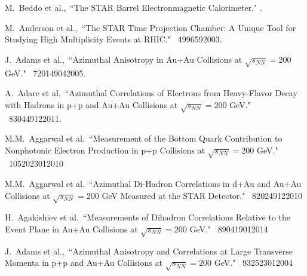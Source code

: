 \begin{thebibliography}{1000}

M.~Beddo et al.,~``The STAR Barrel Electronmagnetic Calorimeter." .

M.~Anderson et al.,~``The STAR Time Projection Chamber: A Unique Tool for Studying High Multiplicity Events at RHIC." \Journal{\NIM } {~499}{659}{2003}.

J.~Adams et al.,~``Azimuthal Anisotropy in Au+Au Collisions at $\sqrt{s_{NN}} = 200$ GeV." \Journal{\PRC} {~72}{014904}{2005}.

A.~Adare et al.~``Azimuthal Correlations of Electrons from Heavy-Flavor Decay with Hadrons in p+p and Au+Au Collisions at $\sqrt{s_{NN}} = 200$ GeV." \Journal{\PRC} {~83}{044912}{2011}.

M.M.~Aggarwal et al.~``Measurement of the Bottom Quark Contribution to Nonphotonic Electron Production in p+p Collisions at $\sqrt{s_{NN}} = 200$ GeV." \Journal{\PRL} {~105}{202301}{2010}

M.M.~Aggarwal et al.~``Azimuthal Di-Hadron Correlations in d+Au and Au+Au Collisions at $\sqrt{s_{NN}} = 200$ GeV Measured at the STAR Detector." \Journal{\PRC} {~82}{024912}{2010}

H.~Agakishiev et al.~``Measurements of Dihadron Correlations Relative to the Event Plane in Au+Au Collisions at $\sqrt{s_{NN}} = 200$ GeV." \Journal{\PRC} {~89}{041901}{2014}

J.~Adams et al.,~``Azimuthal Anisotropy and Correlations at Large Transverse Momenta in p+p and Au+Au Collisions at $\sqrt{s_{NN}} = 200$ GeV." \Journal{\PRL} {~93}{252301}{2004}

\end{thebibliography}
